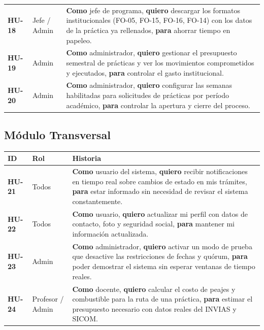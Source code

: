 \documentclass[12pt,a4paper]{article}
\begin{document}
\begin{longtable}{>{\bfseries}p{1.2cm} p{3cm} p{9cm}}
  HU-18 & Jefe / Admin & \textbf{Como} jefe de programa, \textbf{quiero} descargar los formatos institucionales (FO-05, FO-15, FO-16, FO-14) con los datos de la práctica ya rellenados, \textbf{para} ahorrar tiempo en papeleo. \\[4pt]

  HU-19 & Admin & \textbf{Como} administrador, \textbf{quiero} gestionar el presupuesto semestral de prácticas y ver los movimientos comprometidos y ejecutados, \textbf{para} controlar el gasto institucional. \\[4pt]

  HU-20 & Admin & \textbf{Como} administrador, \textbf{quiero} configurar las semanas habilitadas para solicitudes de prácticas por período académico, \textbf{para} controlar la apertura y cierre del proceso. \\

  \bottomrule
\end{longtable}

\subsection{Módulo Transversal}

\begin{longtable}{>{\bfseries}p{1.2cm} p{3cm} p{9cm}}
  \toprule
  \textbf{ID} & \textbf{Rol} & \textbf{Historia} \\
  \midrule

  HU-21 & Todos & \textbf{Como} usuario del sistema, \textbf{quiero} recibir notificaciones en tiempo real sobre cambios de estado en mis trámites, \textbf{para} estar informado sin necesidad de revisar el sistema constantemente. \\[4pt]

  HU-22 & Todos & \textbf{Como} usuario, \textbf{quiero} actualizar mi perfil con datos de contacto, foto y seguridad social, \textbf{para} mantener mi información actualizada. \\[4pt]

  HU-23 & Admin & \textbf{Como} administrador, \textbf{quiero} activar un modo de prueba que desactive las restricciones de fechas y quórum, \textbf{para} poder demostrar el sistema sin esperar ventanas de tiempo reales. \\[4pt]

  HU-24 & Profesor / Admin & \textbf{Como} docente, \textbf{quiero} calcular el costo de peajes y combustible para la ruta de una práctica, \textbf{para} estimar el presupuesto necesario con datos reales del INVIAS y SICOM. \\

  \bottomrule
\end{longtable}
\end{document}
